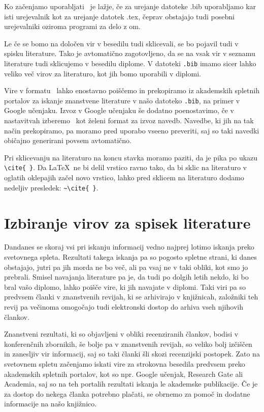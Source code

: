 \documentclass{feridiploma}
\begin{document}
{{	Ko začenjamo uporabljati \BibTeX\ je lažje, če za urejanje datoteke .bib uporabljamo kar isti urejevalnik kot za urejanje datotek .tex, 
	čeprav obstajajo tudi posebni urejevalniki oziroma programi za delo z \BibTeX om.
	
	Le če se bomo na določen vir v besedilu tudi sklicevali, se bo pojavil tudi v spisku literature.
	Tako je avtomatično zagotovljeno, da se na vsak vir v seznamu literature tudi sklicujemo v besedilu diplome.
	V datoteki \texttt{.bib} imamo sicer lahko veliko več virov za literaturo, kot jih bomo uporabili v diplomi.
	
	Vire v formatu \BibTeX\ lahko enostavno poiščemo in prekopiramo iz akademskih spletnih portalov za iskanje znanstvene literature v našo datoteko \texttt{.bib}, na primer v Google učenjaku.
	Izvoz v Google učenjaku še dodatno poenostavimo, če v nastavitvah izberemo \BibTeX\ kot želeni format za izvoz navedb.
	Navedbe, ki jih na tak način prekopiramo, pa moramo pred uporabo vseeno preveriti, saj so taki navedki običajno generirani povsem avtomatično.
	
	Pri sklicevanju na literaturo na koncu stavka moramo paziti, da je pika po ukazu \verb=\cite{ }=.
	Da \LaTeX\ ne bi delil vrstico ravno tako, da bi sklic na literaturo v oglatih oklepajih začel novo vrstico, lahko pred sklicem na literaturo dodamo nedeljiv presledek: \verb=~\cite{ }=.
	
	\section{Izbiranje virov za spisek literature}
	
	Dandanes  se skoraj  vsi pri iskanju informacij vedno najprej lotimo iskanja preko svetovnega spleta.
	Rezultati takega iskanja pa so pogosto spletne strani, ki danes obstajajo, jutri pa jih morda ne bo več, ali pa vsaj ne v taki obliki, kot smo jo prebrali.
	Smisel navajanja literature pa je, da tudi po dolgih letih nekdo, ki bo bral vašo diplomo, lahko poišče vire, ki jih navajate v diplomi.
	Taki viri pa so predvsem članki v znanstvenih revijah, ki se arhivirajo v knjižnicah, založniki teh revij pa večinoma omogočajo tudi elektronski dostop do arhiva vseh njihovih člankov.
	
	Znanstveni rezultati, ki so objavljeni v obliki recenziranih člankov, bodisi v konferenčnih zbornikih, še bolje pa v znanstvenih revijah, so veliko bolj izčiščen in zanesljiv vir informacij, saj
	so taki članki šli skozi recenzijski postopek.
	Zato na svetovnem spletu začenjamo iskati vire za strokovna besedila predvsem preko akademskih spletnih portalov, kot so npr. Google učenjak, Research Gate ali Academia, saj
	so na teh portalih rezultati iskanja le akademske publikacije.
	Če je za dostop do nekega članka potrebno plačati, se obrnemo za pomoč in dodatne informacije na  našo knjižnico.
	
}}
\end{document}
